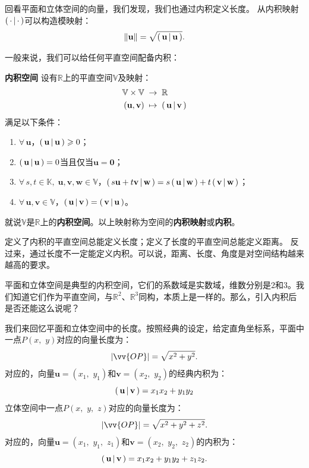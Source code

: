 \documentclass[12pt,UTF8]{ctexbook}
\begin{document}
回看平面和立体空间的向量，我们发现，我们也通过内积定义长度。
从内积映射$\displaystyle\left( \,\cdot \,\middle\vert \,\cdot \,\right)$可以构造模映射：
$$ \| \mathbf{u} \| = \sqrt{\displaystyle\left( \,\mathbf{u} \,\middle\vert \,\mathbf{u} \,\right)}.$$

一般来说，我们可以给任何平直空间配备内积：
\begin{df}{\textbf{内积空间}}
    设有$\mathbb{R}$上的平直空间$\mathbb{V}$及映射：
    \begin{align*}
        \mathbb{V}\times \mathbb{V} \;&\rightarrow \;\mathbb{R} \\
        (\mathbf{u}, \mathbf{v}) \;&\mapsto \; \displaystyle\left( \,\mathbf{u} \,\middle\vert \,\mathbf{v} \,\right)
    \end{align*}
    满足以下条件：
    \begin{enumerate}
        \item $\forall \, \mathbf{u}$，$\displaystyle\left( \,\mathbf{u} \,\middle\vert \,\mathbf{u} \,\right) \geqslant 0$；
        \item $\displaystyle\left( \,\mathbf{u} \,\middle\vert \,\mathbf{u} \,\right) = 0$当且仅当$\mathbf{u} = \mathbf{0}$；
        \item $\forall \, s, t \in \mathbb{K}, \; \mathbf{u}, \mathbf{v}, \mathbf{w}\in \mathbb{V}$，$\displaystyle\left( \,s\mathbf{u} + t\mathbf{v} \,\middle\vert \,\mathbf{w} \,\right) = s\displaystyle\left( \,\mathbf{u} \,\middle\vert \,\mathbf{w} \,\right) + t\displaystyle\left( \,\mathbf{v} \,\middle\vert \,\mathbf{w} \,\right)$；
        \item $\forall \, \mathbf{u}, \mathbf{v} \in \mathbb{V}$，$\displaystyle\left( \,\mathbf{u} \,\middle\vert \,\mathbf{v} \,\right) = \displaystyle\left( \,\mathbf{v} \,\middle\vert \,\mathbf{u} \,\right)$。
    \end{enumerate}
    就说$\mathbb{V}$是$\mathbb{R}$上的\textbf{内积空间}。以上映射称为空间的\textbf{内积映射}或\textbf{内积}。
\end{df}

定义了内积的平直空间总能定义长度；定义了长度的平直空间总能定义距离。
反过来，通过长度不一定能定义内积。可以说，距离、长度、角度是对空间结构越来越高的要求。

平面和立体空间是典型的内积空间，它们的系数域是实数域，维数分别是$2$和$3$。我们知道它们作为平直空间，与$\mathbb{R}^2$、$\mathbb{R}^3$同构，本质上是一样的。那么，引入内积后是否还能这么说呢？

我们来回忆平面和立体空间中的长度。按照经典的设定，给定直角坐标系，平面中一点$P(x, \,\,y)$对应的向量长度为：
$$ | \vv{OP} | = \sqrt{x^2 + y^2}.$$
对应的，向量$\mathbf{u} = (x_1, \,\,y_1)$和$\mathbf{v} = (x_2, \,\,y_2)$的经典内积为：
$$ \displaystyle\left( \,\mathbf{u} \,\middle\vert \,\mathbf{v} \,\right) = x_1x_2 + y_1y_2 $$
立体空间中一点$P(x, \,\,y, \,\,z)$对应的向量长度为：
$$ | \vv{OP} | = \sqrt{x^2 + y^2 + z^2}.$$
对应的，向量$\mathbf{u} = (x_1, \,\,y_1,\,\,z_1)$和$\mathbf{v} = (x_2, \,\,y_2,\,\,z_2)$的内积为：
$$ \displaystyle\left( \,\mathbf{u} \,\middle\vert \,\mathbf{v} \,\right) = x_1x_2 + y_1y_2 + z_1z_2.$$
\end{document}
